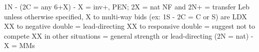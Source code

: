 1N - (2C = any 6+X) - X = inv+, PEN; 2X = nat NF and 2N+ = transfer Leb
unless otherwise specified, X to multi-way bids (ex: 1S - 2C = C or S) are LDX
XX to negative double = lead-directing
XX to responsive double = suggest not to compete
XX in other situations = general strength or lead-directing
(2N = nat) - X = MMs